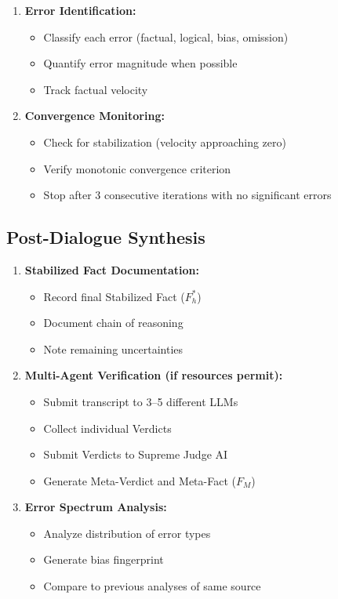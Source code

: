\documentclass[11pt,a4paper]{article}
\begin{document}
\begin{small}
\begin{enumerate}[leftmargin=*, resume]
    \item \textbf{Error Identification:}
    \begin{itemize}[nosep]
        \item Classify each error (factual, logical, bias, omission)
        \item Quantify error magnitude when possible
        \item Track factual velocity
    \end{itemize}
    
    \item \textbf{Convergence Monitoring:}
    \begin{itemize}[nosep]
        \item Check for stabilization (velocity approaching zero)
        \item Verify monotonic convergence criterion
        \item Stop after 3 consecutive iterations with no significant errors
    \end{itemize}
\end{enumerate}

\subsection*{Post-Dialogue Synthesis}
\begin{enumerate}[leftmargin=*, resume]
    \item \textbf{Stabilized Fact Documentation:}
    \begin{itemize}[nosep]
        \item Record final Stabilized Fact ($F_h^*$)
        \item Document chain of reasoning
        \item Note remaining uncertainties
    \end{itemize}
    
    \item \textbf{Multi-Agent Verification (if resources permit):}
    \begin{itemize}[nosep]
        \item Submit transcript to 3--5 different LLMs
        \item Collect individual Verdicts
        \item Submit Verdicts to Supreme Judge AI
        \item Generate Meta-Verdict and Meta-Fact ($F_M$)
    \end{itemize}
    
    \item \textbf{Error Spectrum Analysis:}
    \begin{itemize}[nosep]
        \item Analyze distribution of error types
        \item Generate bias fingerprint
        \item Compare to previous analyses of same source
    \end{itemize}
\end{enumerate}


\end{small}
\end{document}
